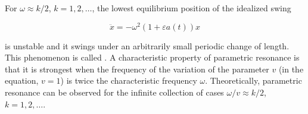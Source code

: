 For $\omega \approx k/2$, $k = 1, 2, \ldots$, the lowest equilibrium position of the idealized swing

$$\ddot{x} = -\omega^2(1 + \varepsilon a(t))x$$

is unstable and it swings under an arbitrarily small periodic change of length. This phenomenon is called . A characteristic property of parametric resonance is that it is strongest when the frequency of the variation of the parameter $v$ (in the equation, $v = 1$) is twice the characteristic frequency $\omega$. Theoretically, parametric resonance can be observed for the infinite collection of cases $\omega/v \approx k/2$, $k = 1, 2, \ldots$.
